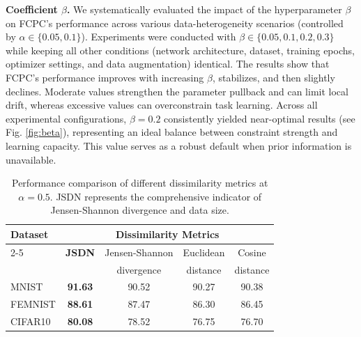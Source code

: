 \documentclass[journal,twoside,web]{ieeecolor}
\begin{document}
\textbf{Coefficient $\beta$. }We systematically evaluated the impact of the hyperparameter $\beta$ on FCPC's performance across various data-heterogeneity scenarios (controlled by $\alpha \in \{0.05, 0.1\}$). Experiments were conducted with $\beta \in \{0.05, 0.1, 0.2, 0.3\}$ while keeping all other conditions (network architecture, dataset, training epochs, optimizer settings, and data augmentation) identical.
The results show that FCPC's performance improves with increasing $\beta$, stabilizes, and then slightly declines. Moderate values strengthen the parameter pullback and can limit local drift, whereas excessive values can overconstrain task learning.
Across all experimental configurations, $\beta = 0.2$ consistently yielded near-optimal results (see Fig. \ref{fig:beta}), representing an ideal balance between constraint strength and learning capacity. This value serves as a robust default when prior information is unavailable.


\begin{table}[htbp]
\caption{Performance comparison of different dissimilarity metrics at $\alpha = 0.5$. JSDN represents the comprehensive indicator of Jensen-Shannon divergence and data size.}
\label{tab:dissimilarity}
\centering
\footnotesize  %
\begin{tabular}{lcccc}
\toprule
\multirow{2}{*}{Dataset} & \multicolumn{4}{c}{Dissimilarity Metrics} \\
\cmidrule(lr){2-5}
& \textbf{JSDN} & \multicolumn{1}{c}{Jensen-Shannon} & \multicolumn{1}{c}{Euclidean} & \multicolumn{1}{c}{Cosine} \\
& & \multicolumn{1}{c}{divergence} & \multicolumn{1}{c}{distance} & \multicolumn{1}{c}{distance} \\
\midrule
MNIST    & \textbf{91.63} & 90.52 & 90.27 & 90.38 \\
FEMNIST  & \textbf{88.61} & 87.47 & 86.30 & 86.45 \\
CIFAR10  & \textbf{80.08} & 78.52 & 76.75 & 76.70 \\
\bottomrule
\end{tabular}
\label{tab:comparsion of metrics}
\end{table}



\end{document}

